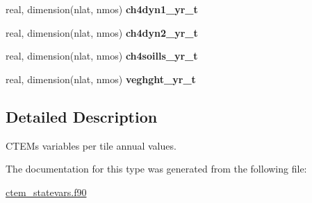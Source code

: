 \begin{DoxyCompactItemize}
\item 
\hypertarget{structctem__statevars_1_1ctem__tileavg__annual_a16a3d0604144a08410f1e1d16449e548}{}real, dimension(nlat, nmos) {\bfseries ch4dyn1\+\_\+yr\+\_\+t}\label{structctem__statevars_1_1ctem__tileavg__annual_a16a3d0604144a08410f1e1d16449e548}

\item 
\hypertarget{structctem__statevars_1_1ctem__tileavg__annual_ae1705c34b1db3514449a1b3b0f6ad0b2}{}real, dimension(nlat, nmos) {\bfseries ch4dyn2\+\_\+yr\+\_\+t}\label{structctem__statevars_1_1ctem__tileavg__annual_ae1705c34b1db3514449a1b3b0f6ad0b2}

\item 
\hypertarget{structctem__statevars_1_1ctem__tileavg__annual_ab67d092e8b427e22886fa04fc552cfde}{}real, dimension(nlat, nmos) {\bfseries ch4soills\+\_\+yr\+\_\+t}\label{structctem__statevars_1_1ctem__tileavg__annual_ab67d092e8b427e22886fa04fc552cfde}

\item 
\hypertarget{structctem__statevars_1_1ctem__tileavg__annual_ae2944baabbe643406d14e8b72ea34708}{}real, dimension(nlat, nmos) {\bfseries veghght\+\_\+yr\+\_\+t}\label{structctem__statevars_1_1ctem__tileavg__annual_ae2944baabbe643406d14e8b72ea34708}

\end{DoxyCompactItemize}


\subsection{Detailed Description}
C\+T\+E\+M\textquotesingle{}s variables per tile annual values. 

The documentation for this type was generated from the following file\+:\begin{DoxyCompactItemize}
\item 
\hyperlink{ctem__statevars_8f90}{ctem\+\_\+statevars.\+f90}\end{DoxyCompactItemize}
